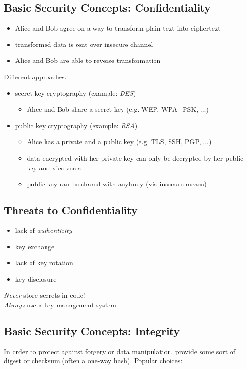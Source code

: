 \documentclass[xga]{xdvislides}
\begin{document}
\subsection{Basic Security Concepts: Confidentiality}
\begin{itemize}
	\item Alice and Bob agree on a way to transform plain text into ciphertext
	\item transformed data is sent over insecure channel
	\item Alice and Bob are able to reverse transformation
\end{itemize}
\addvspace{.5in}
Different approaches:
\begin{itemize}
	\item secret key cryptography (example: {\em DES})
		\begin{itemize}
			\item Alice and Bob share a secret key (e.g. WEP, WPA−PSK, ...)
		\end{itemize}
\end{itemize}
\addvspace{.25in}
\begin{itemize}
	\item public key cryptography (example: {\em RSA})
		\begin{itemize}
			\item Alice has a private and a public key (e.g. TLS, SSH, PGP, ...)
			\item data encrypted with her private key can only be decrypted by
				her public key and vice versa
			\item public key can be shared with anybody (via insecure means)
		\end{itemize}
\end{itemize}

\subsection{Threats to Confidentiality}
\begin{itemize}
	\item lack of {\em authenticity}
	\item key exchange
	\item lack of key rotation
	\item key disclosure
\end{itemize}
\addvspace{.5in}
{\em Never} store secrets in code! \\
{\em Always} use a key management system.

\subsection{Basic Security Concepts: Integrity}
In order to protect against forgery or data manipulation, provide some sort of
digest or checksum (often a one-way hash).  Popular choices:
\end{document}
